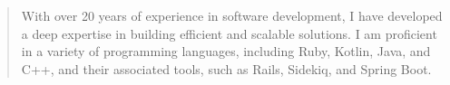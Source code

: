 \begin{minipage}{\linewidth}
\begin{quote}
With over 20 years of experience in software development, I have developed a deep expertise in building efficient and scalable solutions. I am proficient in a variety of programming languages, including Ruby, Kotlin, Java, and C++, and their associated tools, such as Rails, Sidekiq, and Spring Boot.
\end{quote}
\end{minipage}
